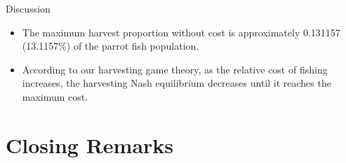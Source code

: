 \documentclass{beamer}
\begin{document}
\begin{frame}{Discussion}
    \begin{itemize}
        \item<1-> The maximum harvest proportion without cost is approximately 0.131157 (13.1157\%) of the parrot fish population. 
        \item<2-> According to our harvesting game theory, as the relative cost of fishing increases, the harvesting Nash equilibrium decreases until it reaches the maximum cost.
    \end{itemize}
\end{frame}

\section{Closing Remarks}
\end{document}
